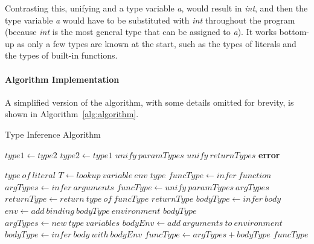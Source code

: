 Contrasting this, unifying  and a type variable \textit{a}, would result in \textit{int}, and then the type
variable \textit{a} would have to be substituted with \textit{int} throughout the program (because \textit{int} is the
most general type that can be assigned to \textit{a}).
It works bottom-up as only a few types are known at the start, such as the types of literals and the types of
built-in functions.

\paragraph{Algorithm Implementation}\label{par:algorithm-implementation}
A simplified version of the algorithm, with some details omitted for brevity, is shown in Algorithm~\ref{alg:algorithm}.

\begin{algorithm}
    \caption{Type Inference Algorithm}
    \begin{algorithmic}[1]
                \State $type1 \gets type2$
            \EndIf
                \State $type2 \gets type1$
            \EndIf
                \State $unify\ paramTypes$
                \State $unify\ returnTypes$
            \EndIf
                \State \textbf{error}
            \EndIf
        \EndFunction

                \State \Return $type\ of\ literal$
            \EndIf
                \State $T \gets lookup\ variable\ env$
                \State \Return $type$
            \EndIf
                \State $funcType \gets infer\ function$
                \State $argTypes \gets infer\ arguments$
                \State $funcType \gets unify\ paramTypes\ argTypes$
                \State $returnType \gets return\ type\ of\ funcType$
                \State \Return $returnType$
            \EndIf
                \State $bodyType \gets infer\ body$
                \State $env \gets add\ binding\ bodyType\ environment$
                \State \Return $bodyType$
            \EndIf
                \State $argTypes \gets new\ type\ variables$
                \State $bodyEnv \gets add\ arguments\ to\ environment$
                \State $bodyType \gets infer\ body\ with\ bodyEnv$
                \State $funcType \gets argTypes+bodyType$
                \State \Return $funcType$
            \EndIf
        \EndFunction
    \end{algorithmic}\label{alg:algorithm}
\end{algorithm}

